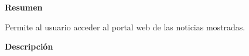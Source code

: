 

\begin{large}
	\textbf{Resumen}\\
\end{large}

Permite al usuario acceder al portal web de las noticias mostradas.\\

\begin{large}
	\textbf{Descripción}\\
\end{large} 


